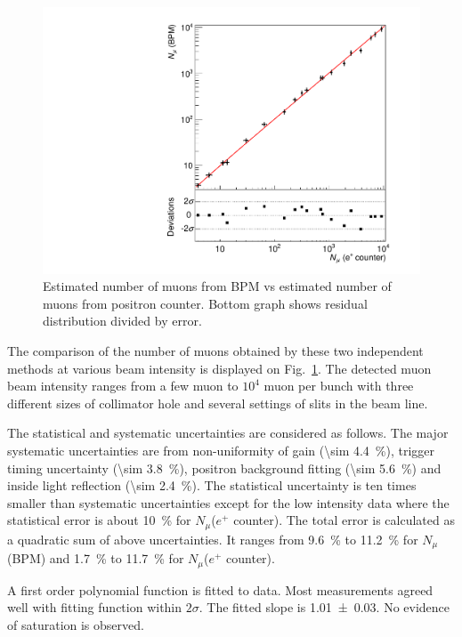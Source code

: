 \documentclass[preprint,3p,twocolumn]{elsarticle}
\begin{document}
\begin{figure}[tbp]
	\centering
	\includegraphics[width=\columnwidth]{figure/lin.pdf}
        \caption{Estimated number of muons from BPM vs estimated
          number of muons from positron counter.  Bottom graph
          shows residual distribution divided by error.}
\label{fig:muvsmu}
\end{figure}

The comparison of the number of muons obtained by these two
independent methods at various beam intensity is displayed on
Fig.~\ref{fig:muvsmu}. The detected muon beam intensity ranges
from a few muon to $10^{4}$ muon per bunch with three different
sizes of collimator hole and several settings of slits in the
beam line.

The statistical and systematic uncertainties are considered as
follows. The major systematic uncertainties are from
non-uniformity of gain (\SI{\sim 4.4}{\percent}), trigger timing
uncertainty (\SI{\sim 3.8}{\percent}), positron background
fitting (\SI{\sim 5.6}{\percent}) and inside light reflection
(\SI{\sim 2.4}{\percent}).  The statistical uncertainty is ten
times smaller than systematic uncertainties except for the low
intensity data where the statistical error is about
\SI{10}{\percent} for $N_\mu$($e^+$ counter).  The total error
is calculated as a quadratic sum of above uncertainties. It
ranges from \SI{9.6}{\percent} to \SI{11.2}{\percent} for 
$N_\mu$(BPM) and \SI{1.7}{\percent} to \SI{11.7}{\percent} for 
$N_\mu$($e^+$ counter).

A first order polynomial function is fitted to data.  Most
measurements agreed well with fitting function within $2\sigma$.
The fitted slope is \num{1.01 \pm 0.03}. No evidence of
saturation is observed.
\end{document}
